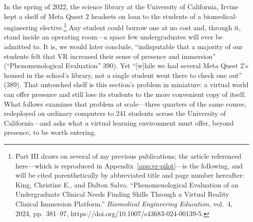 In the spring of 2022, the science library at the University of California,
Irvine kept a shelf of Meta Quest 2 headsets on loan to the students of a
biomedical-engineering elective.\footnote{Part III draws on several of my
previous publications; the article referenced here---which is reproduced in
Appendix~\ref{app:vr-pilot}---is the following, and will be cited
parenthetically by abbreviated title and page number hereafter: King, Christine
E., and Dalton Salvo. ``Phenomenological Evaluation of an Undergraduate Clinical
Needs Finding Skills Through a Virtual Reality Clinical Immersion Platform.''
\textit{Biomedical Engineering Education}, vol.~4, 2024, pp.~381--97,
https://doi.org/10.1007/s43683-024-00139-5.} Any student could borrow one at no
cost and, through it, stand inside an operating room---a space few
undergraduates will ever be admitted to. It is, we would later conclude,
``indisputable that a majority of our students felt that VR increased their
sense of presence and immersion'' (``Phenomenological Evaluation'' 390). Yet
``[w]hile we had several Meta Quest 2's housed in the school's library, not a
single student went there to check one out'' (389). That untouched shelf is this
section's problem in miniature: a virtual world can offer presence and still
lose its students to the more convenient copy of itself. What follows examines
that problem at scale---three quarters of the same course, redeployed on
ordinary computers to 241 students across the University of California---and
asks what a virtual learning environment must offer, beyond presence, to be
worth entering.


